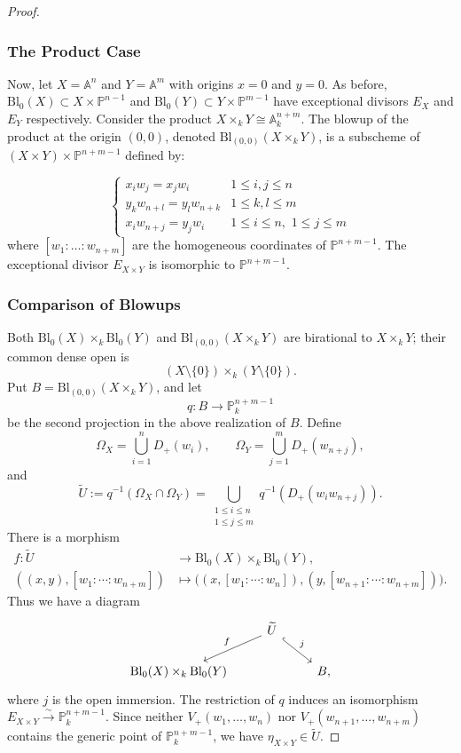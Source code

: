 \begin{proof}
\subsubsection*{The Product Case}
Now, let $X = \mathbb{A}^n$ and $Y = \mathbb{A}^m$ with origins $x=0$ and $y=0$. 
As before, $\text{Bl}_0(X) \subset X \times \mathbb{P}^{n-1}$ and $\text{Bl}_0(Y) \subset Y \times \mathbb{P}^{m-1}$ have exceptional divisors $E_X$ and $E_Y$ respectively.
Consider the product $X \times_k Y \cong \mathbb{A}_k^{n+m}$. 
The blowup of the product at the origin $(0,0)$, denoted $\text{Bl}_{(0,0)}(X \times_k Y)$, is a subscheme of $(X \times Y) \times \mathbb{P}^{n+m-1}$ defined by:

$$\begin{cases} 
x_i w_j = x_j w_i & 1 \le i, j \le n \\
y_k w_{n+l} = y_l w_{n+k} & 1 \le k, l \le m \\
x_i w_{n+j} = y_j w_i & 1 \le i \le n, \,\, 1 \le j \le m 
\end{cases}$$
where $[w_1 : \dots : w_{n+m}]$ are the homogeneous coordinates of $\mathbb{P}^{n+m-1}$. The exceptional divisor $E_{X \times Y}$ is isomorphic to $\mathbb{P}^{n+m-1}$.

\subsubsection*{Comparison of Blowups}

Both $\text{Bl}_0(X) \times_k \text{Bl}_0(Y)$ and
$\text{Bl}_{(0,0)}(X \times_k Y)$ are birational to $X \times_k Y$; their
common dense open is
\[
    (X\setminus\{0\})\times_k(Y\setminus\{0\}).
\]
Put $B=\text{Bl}_{(0,0)}(X\times_kY)$, and let
\[
    q\colon B\longrightarrow\mathbb P_k^{n+m-1}
\]
be the second projection in the above realization of $B$. Define
\[
    \Omega_X=\bigcup_{i=1}^{n}D_+(w_i),
    \qquad
    \Omega_Y=\bigcup_{j=1}^{m}D_+(w_{n+j}),
\]
and
\[
    \widetilde U
      :=q^{-1}(\Omega_X\cap\Omega_Y)
      =\bigcup_{\substack{1\leq i\leq n\\1\leq j\leq m}}
        q^{-1}\!\left(D_+(w_iw_{n+j})\right).
\]
There is a morphism
\[
\begin{aligned}
f\colon\widetilde U&\longrightarrow
   \text{Bl}_0(X)\times_k\text{Bl}_0(Y),\\
((x,y),[w_1:\cdots:w_{n+m}])&\longmapsto
\bigl((x,[w_1:\cdots:w_n]),
      (y,[w_{n+1}:\cdots:w_{n+m}])\bigr).
\end{aligned}
\]
Thus we have a diagram
\[
\begin{tikzcd}
& \widetilde U \arrow[dl,"f"'] \arrow[dr,hook,"j"] & \\
\text{Bl}_0(X)\times_k\text{Bl}_0(Y)
&& B,
\end{tikzcd}
\]
where $j$ is the open immersion. The restriction of $q$ induces an
isomorphism $E_{X\times Y}\xrightarrow{\sim}\mathbb P_k^{n+m-1}$. Since neither
$V_+(w_1,\ldots,w_n)$ nor $V_+(w_{n+1},\ldots,w_{n+m})$ contains the generic
point of $\mathbb P_k^{n+m-1}$, we have
$\eta_{X\times Y}\in\widetilde U$.


\end{proof}
